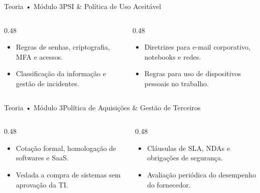 \begin{senaiframe}{Teoria • Módulo 3}{PSI \& Política de Uso Aceitável}
  \begin{columns}[t]
    \begin{column}{0.48\textwidth}
      \begin{tcolorbox}[senaibluecard, title={PSI (Segurança)}]
        \begin{itemize}
          \item Regras de senhas, criptografia, MFA e acessos.
          \item Classificação da informação e gestão de incidentes.
        \end{itemize}
      \end{tcolorbox}
    \end{column}
    \begin{column}{0.48\textwidth}
      \begin{tcolorbox}[senaiambercard, title={Uso Aceitável (BYOD)}]
        \begin{itemize}
          \item Diretrizes para e-mail corporativo, notebooks e redes.
          \item Regras para uso de dispositivos pessoais no trabalho.
        \end{itemize}
      \end{tcolorbox}
    \end{column}
  \end{columns}
\end{senaiframe}

\begin{senaiframe}{Teoria • Módulo 3}{Política de Aquisições \& Gestão de Terceiros}
  \begin{columns}[t]
    \begin{column}{0.48\textwidth}
      \begin{tcolorbox}[senaicard, title={Aquisição de TI}]
        \begin{itemize}
          \item Cotação formal, homologação de softwares e SaaS.
          \item Vedada a compra de sistemas sem aprovação da TI.
        \end{itemize}
      \end{tcolorbox}
    \end{column}
    \begin{column}{0.48\textwidth}
      \begin{tcolorbox}[senaigreencard, title={Gestão de Fornecedores}]
        \begin{itemize}
          \item Cláusulas de SLA, NDAs e obrigações de segurança.
          \item Avaliação periódica do desempenho do fornecedor.
        \end{itemize}
      \end{tcolorbox}
    \end{column}
  \end{columns}
\end{senaiframe}

